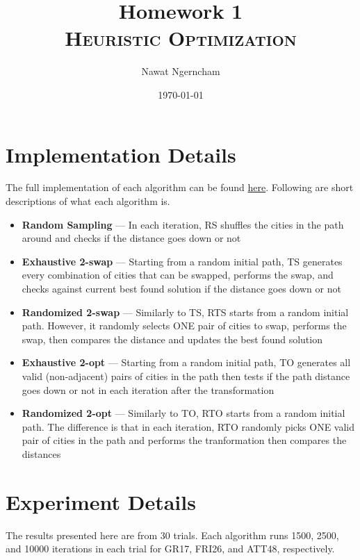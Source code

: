 \documentclass{article}
\title{\Huge{Homework 1}
	\\
	\Large\scshape{Heuristic Optimization}}
\author{Nawat Ngerncham}
\date{\today}
\begin{document}
\maketitle
	
\section{Implementation Details}

The full implementation of each algorithm can be found \hyperlink{https://github.com/nngerncham/ma395_heuristic/tree/main/homework/hw1/tsp_algorithms}{here}. Following are short descriptions of what each algorithm is.

\begin{itemize}
    \item \textbf{Random Sampling} ---
        In each iteration, RS shuffles the cities in the path around and checks if the distance goes down or not

    \item \textbf{Exhaustive 2-swap} ---
        Starting from a random initial path, TS generates every combination of cities that can be swapped, performs the swap, and checks against current best found solution if the distance goes down or not
    \item \textbf{Randomized 2-swap} ---
        Similarly to TS, RTS starts from a random initial path. However, it randomly selects ONE pair of cities to swap, performs the swap, then compares the distance and updates the best found solution

    \item \textbf{Exhaustive 2-opt} --- 
        Starting from a random initial path, TO generates all valid (non-adjacent) pairs of cities in the path then tests if the path distance goes down or not in each iteration after the transformation
    \item \textbf{Randomized 2-opt} --- 
        Similarly to TO, RTO starts from a random initial path. The difference is that in each iteration, RTO randomly picks ONE valid pair of cities in the path and performs the tranformation then compares the distances
\end{itemize}

\section{Experiment Details}

The results presented here are from 30 trials. Each algorithm runs 1500, 2500, and 10000 iterations in each trial for GR17, FRI26, and ATT48, respectively.
\end{document}

